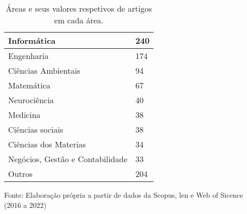\begin{table}[htp!]
	\centering
	\caption{Áreas e seus valores respetivos de artigos em cada área.}\label{tb3}
	\begin{tabular}{@{}ll@{}}
		\toprule
		Informática                      & 240 \\ \midrule
		Engenharia                       & 174 \\
		Ciências Ambientais              & 94  \\
		Matemática                       & 67  \\
		Neurociência                     & 40  \\
		Medicina                         & 38  \\
		Ciências sociais                 & 38  \\
		Ciências dos Materias            & 34  \\
		Negócios, Gestão e Contabilidade & 33  \\
		Outros                           & 204 \\ \bottomrule
	\end{tabular}

	\vspace{0.2cm}
	Fonte: Elaboração própria a partir de dados da Scopus, len e Web of Sicence (2016 a 2022)
\end{table}